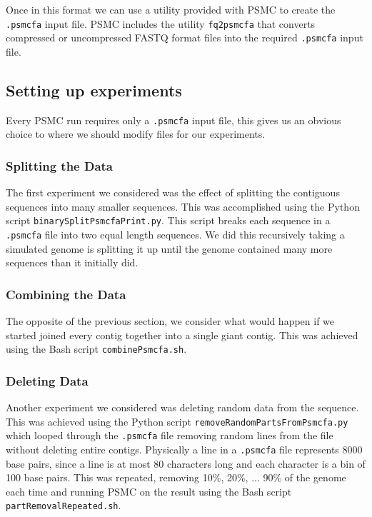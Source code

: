 \documentclass[]{article}
\begin{document}
Once in this format we can use a utility provided with PSMC to create the \verb|.psmcfa| input file. PSMC includes the utility \verb|fq2psmcfa| that converts compressed or uncompressed FASTQ format files into the required \verb|.psmcfa| input file.

\subsection{Setting up experiments} %
Every PSMC run requires only a \verb|.psmcfa| input file, this gives us an obvious choice to where we should modify files for our experiments. 

\subsubsection{Splitting the Data}
The first experiment we considered was the effect of splitting the contiguous sequences into many smaller sequences. This was accomplished using the Python script \verb|binarySplitPsmcfaPrint.py|. This script breaks each sequence in a \verb|.psmcfa| file into two equal length sequences. We did this recursively taking a simulated genome is splitting it up until the genome contained many more sequences than it initially did. 

\subsubsection{Combining the Data}
The opposite of the previous section, we consider what would happen if we started joined every contig together into a single giant contig. This was achieved using the Bash script \verb|combinePsmcfa.sh|. 

\subsubsection{Deleting Data}
Another experiment we considered was deleting random data from the sequence. This was achieved using the Python script \verb|removeRandomPartsFromPsmcfa.py| which looped through the \verb|.psmcfa| file removing random lines from the file without deleting entire contigs. Physically a line in a \verb|.psmcfa| file represents 8000 base pairs, since a line is at most 80 characters long and each character is a bin of 100 base pairs. This was repeated, removing 10\%, 20\%, ... 90\% of the genome each time and running PSMC on the result using the Bash script \verb|partRemovalRepeated.sh|.
\end{document}
